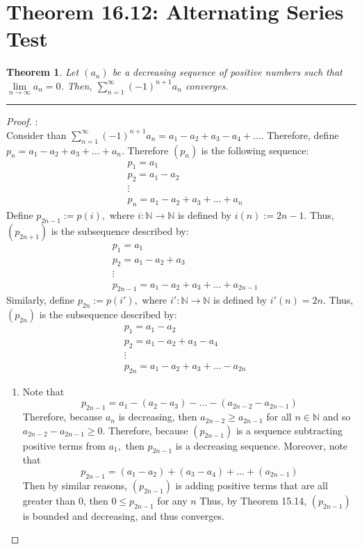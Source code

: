 \documentclass[openany, amssymb, psamsfonts]{amsart}
\newcommand{\bbN}{\mathbb{N}}
\newtheorem{thm}{Theorem}[section]
\theoremstyle{definition}
\numberwithin{equation}{section}
\begin{document}
\section*{Theorem 16.12: Alternating Series Test}
\begin{thm}
\label{16.12}
	Let $(a_n)$ be a decreasing sequence of positive numbers such that $\lim\limits_{n \to \infty} a_n = 0$. Then, $\displaystyle\sum_{n = 1}^{\infty} (-1)^{n+1} a_n$ converges. 
\end{thm}
\vspace{4pt}     \hrule   \vspace{4pt}\begin{proof}:\\
Consider than $\displaystyle\sum_{n = 1}^{\infty} (-1)^{n+1} a_n = a_1 - a_2 + a_3 - a_4 + \dots.$ Therefore, define $p_n = a_1 - a_2 + a_3 + \dots + a_n.$ Therefore $(p_n)$ is the following sequence:
\begin{align*}
    &p_1 = a_1\\
    &p_2 = a_1 - a_2\\
    &\vdots\\
    &p_n = a_1 - a_2  + a_3 + \dots + a_n
\end{align*}
Define $p_{2n-1} := p(i),$ where $i: \bbN \to \bbN$ is defined by $i(n):= 2n-1.$ Thus, $(p_{2n+1})$ is the subsequence described by:
\begin{align*}
    &p_1 = a_1\\
    &p_2 = a_1 - a_2 + a_3\\
    &\vdots\\
    &p_{2n-1} = a_1 - a_2  + a_3 + \dots + a_{2n-1}
\end{align*}
Similarly, define $p_{2n}:= p(i'),$ where $i': \bbN \to \bbN$ is defined by $i'(n) = 2n.$ Thus, $(p_{2n})$ is the subsequence described by:
\begin{align*}
    &p_1 = a_1 - a_2\\
    &p_2 = a_1 - a_2 + a_3 - a_4\\
    &\vdots\\
    &p_{2n} = a_1 - a_2  + a_3 + \dots - a_{2n}
\end{align*}
\begin{enumerate}
    \item  Note that \[p_{2n-1} =  a_1 - (a_2  - a_3) - \dots - (a_{2n-2} -a_{2n-1})\] Therefore, because $a_n$ is decreasing, then $a_{2n-2}\geq a_{2n-1}$ for all $n \in \bbN$ and so $a_{2n-2} - a_{2n-1}\geq 0.$ Therefore, because $(p_{2n-1})$ is a sequence subtracting positive terms from $a_1,$ then $p_{2n-1}$ is a decreasing sequence. Moreover, note that \[p_{2n-1} = (a_1 - a_2) + (a_3 - a_4) + \dots + (a_{2n-1})\] Then by similar reasons, $(p_{2n-1})$ is adding positive terms that are all greater than 0, then $0\leq p_{2n-1}$ for any $n$ Thus, by Theorem 15.14, $(p_{2n-1})$ is bounded and decreasing, and thus converges.

\end{enumerate}
\end{proof}
\end{document}
